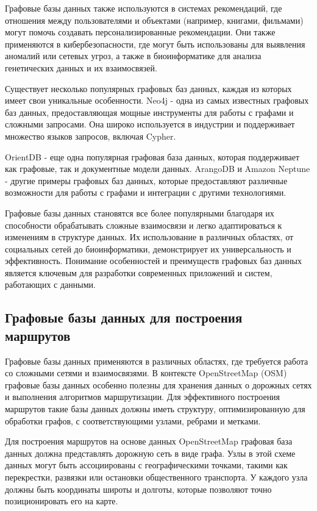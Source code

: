 Графовые базы данных также используются в системах рекомендаций, где отношения между пользователями и объектами (например, книгами, фильмами) могут помочь создавать персонализированные рекомендации. Они также применяются в кибербезопасности, где могут быть использованы для выявления аномалий или сетевых угроз, а также в биоинформатике для анализа генетических данных и их взаимосвязей.

Существует несколько популярных графовых баз данных, каждая из которых имеет свои уникальные особенности. Neo4j - одна из самых известных графовых баз данных, предоставляющая мощные инструменты для работы с графами и сложными запросами. Она широко используется в индустрии и поддерживает множество языков запросов, включая Cypher.

OrientDB - еще одна популярная графовая база данных, которая поддерживает как графовые, так и документные модели данных. ArangoDB и Amazon Neptune - другие примеры графовых баз данных, которые предоставляют различные возможности для работы с графами и интеграции с другими технологиями.

Графовые базы данных становятся все более популярными благодаря их способности обрабатывать сложные взаимосвязи и легко адаптироваться к изменениям в структуре данных. Их использование в различных областях, от социальных сетей до биоинформатики, демонстрирует их универсальность и эффективность. Понимание особенностей и преимуществ графовых баз данных является ключевым для разработки современных приложений и систем, работающих с данными.


\subsection{Графовые базы данных для построения маршрутов}

Графовые базы данных применяются в различных областях, где требуется работа со сложными сетями и взаимосвязями. В контексте OpenStreetMap (OSM) графовые базы данных особенно полезны для хранения данных о дорожных сетях и выполнения алгоритмов маршрутизации. Для эффективного построения маршрутов такие базы данных должны иметь структуру, оптимизированную для обработки графов, с соответствующими узлами, ребрами и метками.

Для построения маршрутов на основе данных OpenStreetMap графовая база данных должна представлять дорожную сеть в виде графа. Узлы в этой схеме данных могут быть ассоциированы с географическими точками, такими как перекрестки, развязки или остановки общественного транспорта. У каждого узла должны быть координаты широты и долготы, которые позволяют точно позиционировать его на карте.

